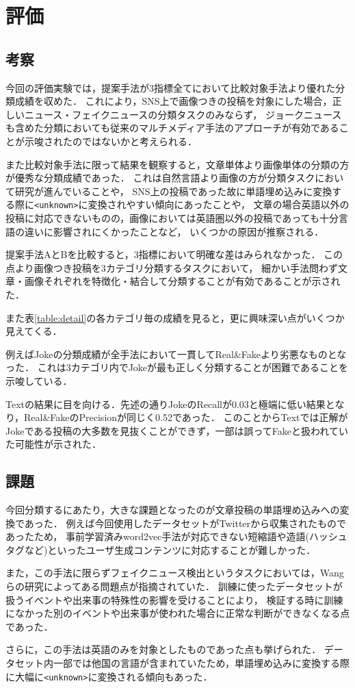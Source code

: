 \chapter{評価}\label{ch:evaluate}

\section{考察}
今回の評価実験では，提案手法が3指標全てにおいて比較対象手法より優れた分類成績を収めた．
これにより，SNS上で画像つきの投稿を対象にした場合，正しいニュース・フェイクニュースの分類タスクのみならず，
ジョークニュースも含めた分類においても従来のマルチメディア手法のアプローチが有効であることが示唆されたのではないかと考えられる．

また比較対象手法に限って結果を観察すると，文章単体より画像単体の分類の方が優秀な分類成績であった．
これは自然言語より画像の方が分類タスクにおいて研究が進んでいることや，
SNS上の投稿であった故に単語埋め込みに変換する際に\texttt{<unknown>}に変換されやすい傾向にあったことや，
文章の場合英語以外の投稿に対応できないものの，画像においては英語圏以外の投稿であっても十分言語の違いに影響されにくかったことなど，
いくつかの原因が推察される．

提案手法AとBを比較すると，3指標において明確な差はみられなかった．
この点より画像つき投稿を3カテゴリ分類するタスクにおいて，
細かい手法問わず文章・画像それぞれを特徴化・結合して分類することが有効であることが示された．

また表\ref{table:detail}の各カテゴリ毎の成績を見ると，更に興味深い点がいくつか見えてくる．

例えばJokeの分類成績が全手法において一貫してReal\&Fakeより劣悪なものとなった．
これは3カテゴリ内でJokeが最も正しく分類することが困難であることを示唆している．

Textの結果に目を向ける．先述の通りJokeのRecallが0.03と極端に低い結果となり，Real\&FakeのPrecisionが同じく0.52であった．
このことからTextでは正解がJokeである投稿の大多数を見抜くことができず，一部は誤ってFakeと扱われていた可能性が示された．

\section{課題}
今回分類するにあたり，大きな課題となったのが文章投稿の単語埋め込みへの変換であった．
例えば今回使用したデータセットがTwitterから収集されたものであったため，
事前学習済みword2vec手法が対応できない短縮語や造語(ハッシュタグなど)といったユーザ生成コンテンツに対応することが難しかった．

また，この手法に限らずフェイクニュース検出というタスクにおいては，Wangらの研究\cite{Wang:2018:EEA:3219819.3219903}によってある問題点が指摘されていた．
訓練に使ったデータセットが扱うイベントや出来事の特殊性の影響を受けることにより，
検証する時に訓練になかった別のイベントや出来事が使われた場合に正常な判断ができなくなる点であった．

さらに，この手法は英語のみを対象としたものであった点も挙げられた．
データセット内一部では他国の言語が含まれていたため，単語埋め込みに変換する際に大幅に\texttt{<unknown>}に変換される傾向もあった．
%